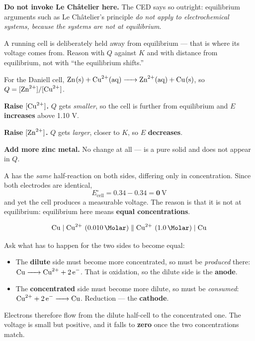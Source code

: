 \documentclass{apchem-notes}
\begin{document}
\begin{apctrap}
\textbf{Do not invoke Le Ch\^atelier here.} The CED says so outright:
equilibrium arguments such as Le Ch\^atelier's principle \emph{do not apply
to electrochemical systems, because the systems are not at equilibrium}.

A running cell is deliberately held away from equilibrium --- that is where
its voltage comes from. Reason with $Q$ against $K$ and with distance from
equilibrium, not with ``the equilibrium shifts.''
\end{apctrap}

\begin{workedexample}
For the Daniell cell,
$\ce{Zn(s) + Cu^2+(aq) -> Zn^2+(aq) + Cu(s)}$, so
$Q = [\ce{Zn^2+}]/[\ce{Cu^2+}]$.

\textbf{Raise $[\ce{Cu^2+}]$.} $Q$ gets \emph{smaller}, so the cell is
further from equilibrium and $E$ \textbf{increases} above 1.10 V.

\textbf{Raise $[\ce{Zn^2+}]$.} $Q$ gets \emph{larger}, closer to $K$, so
$E$ \textbf{decreases}.

\textbf{Add more zinc metal.} No change at all ---  is a pure
solid and does not appear in $Q$.
\end{workedexample}



A  has the \emph{same} half-reaction on both sides,
differing only in concentration. Since both electrodes are identical,
\[ E^\circ_{\text{cell}} = 0.34 - 0.34 = \mathbf{0}~\text{V} \]
and yet the cell produces a measurable voltage. The reason is that it is not
at equilibrium: equilibrium here means \textbf{equal concentrations}.

\begin{workedexample}
\[ \ce{Cu} \mid \ce{Cu^2+}~(\SI{0.010}{\Molar}) \parallel
   \ce{Cu^2+}~(\SI{1.0}{\Molar}) \mid \ce{Cu} \]

Ask what has to happen for the two sides to become equal:

\begin{itemize}[leftmargin=*,itemsep=0.25em]
  \item The \textbf{dilute} side must become more concentrated, so
         must be \emph{produced} there:
        $\ce{Cu -> Cu^2+ + 2e^-}$. That is oxidation, so the dilute side is
        the \textbf{anode}.
  \item The \textbf{concentrated} side must become more dilute, so
         must be \emph{consumed}:
        $\ce{Cu^2+ + 2e^- -> Cu}$. Reduction --- the \textbf{cathode}.
\end{itemize}

Electrons therefore flow from the dilute half-cell to the concentrated one.
The voltage is small but positive, and it falls to \textbf{zero} once the
two concentrations match.
\end{workedexample}
\end{document}

